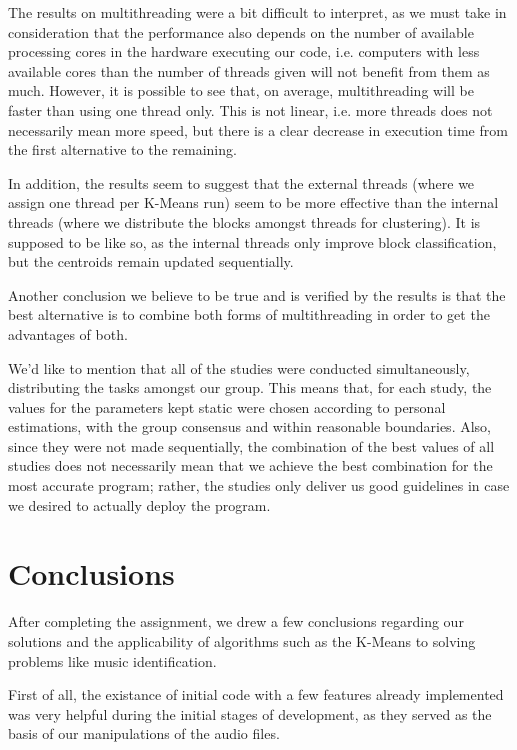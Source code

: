\documentclass[12pt]{article}
\begin{document}
The results on multithreading were a bit difficult to interpret, as we must take 
in consideration that the performance also depends on the number of available 
processing cores in the hardware executing our code, i.e. computers with less
available cores than the number of threads given will not benefit from them as much.
However, it is possible to see that, on average, multithreading will be faster
than using one thread only.
This is not linear, i.e. more threads does not necessarily mean more speed, but
there is a clear decrease in execution time from the first alternative to the 
remaining.

In addition, the results seem to suggest that the external threads (where we 
assign one thread per K-Means run) seem to be more effective than the internal
threads (where we distribute the blocks amongst threads for clustering).
It is supposed to be like so, as the internal threads only improve block 
classification, but the centroids remain updated sequentially.

Another conclusion we believe to be true and is verified by the results is that
the best alternative is to combine both forms of multithreading in order to get
the advantages of both.

\newpage
We'd like to mention that all of the studies were conducted simultaneously,
distributing the tasks amongst our group.
This means that, for each study, the values for the parameters kept static were
chosen according to personal estimations, with the group consensus and within
reasonable boundaries.
Also, since they were not made sequentially, the combination of the best values
of all studies does not necessarily mean that we achieve the best combination for
the most accurate program; rather, the studies only deliver us good guidelines
in case we desired to actually deploy the program.

\section*{Conclusions}

After completing the assignment, we drew a few conclusions regarding our 
solutions and the applicability of algorithms such as the K-Means to solving
problems like music identification.

First of all, the existance of initial code with a few features already 
implemented was very helpful during the initial stages of development, as they 
served as the basis of our manipulations of the audio files.
\end{document}
